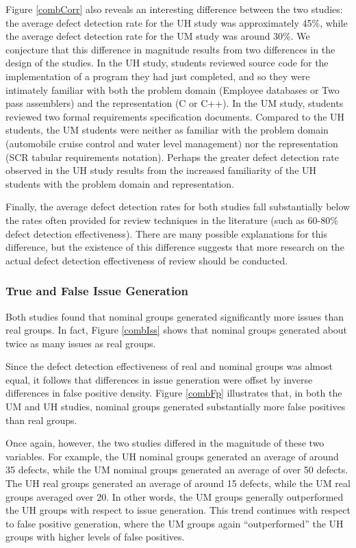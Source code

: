 Figure \ref{combCorr} also reveals an interesting difference between the
two studies: the average defect detection rate for the UH study was
approximately 45\%, while the average defect detection rate for the UM
study was around 30\%.  We conjecture that this difference in magnitude
results from two differences in the design of the studies.  In the
UH study, students reviewed source code for the implementation of a program
they had just completed, and so they were intimately familiar with both
the problem domain (Employee databases or Two pass assemblers) and the
representation (C or C++). In the UM study, students reviewed two formal
requirements specification documents.  Compared to the UH students, the UM
students were neither as familiar with the problem domain (automobile
cruise control and water level management) nor the representation (SCR
tabular requirements notation).  Perhaps the greater defect detection rate
observed in the UH study results from the increased familiarity of the 
UH students with the problem domain and representation. 

Finally, the average defect detection rates for both studies fall
substantially below the rates often provided for review techniques in the
literature (such as 60-80\% defect detection effectiveness).  There are
many possible explanations for this difference, but the existence of this
difference suggests that more research on the actual defect detection
effectiveness of review should be conducted.

\subsubsection{True and False Issue Generation}

Both studies found that nominal groups generated significantly more issues
than real groups.  In fact, Figure \ref{combIss} shows that  nominal groups 
generated about twice as many issues as real groups. 

Since the defect detection effectiveness of real and nominal groups was 
almost equal, it follows that differences in issue generation were
offset by inverse differences in false positive density. Figure 
\ref{combFp} illustrates that, in both the UM and UH studies, nominal groups 
generated substantially more false positives than real groups.  

Once again, however, the two studies differed in the magnitude of these
two variables. For example, the UH nominal groups generated an average of
around 35 defects, while the UM nominal groups generated an average of over
50 defects. The UH real groups generated an average of around 15 defects,
while the UM real groups averaged over 20.  In other words, the UM groups
generally outperformed the UH groups with respect to issue generation.
This trend continues with respect to false positive generation, where the
UM groups again ``outperformed'' the UH groups with higher levels of false
positives.

